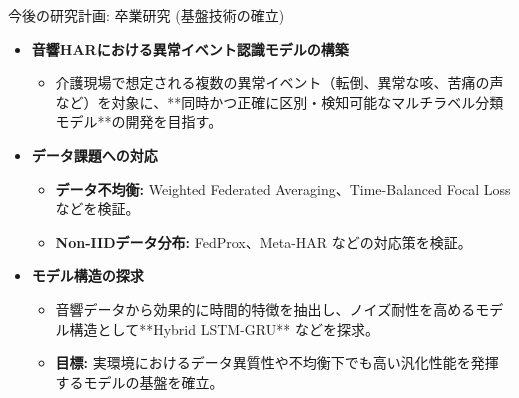 \documentclass[unicode,12pt,aspectratio=169, dvipdfmx]{beamer}
\begin{document}
\begin{frame}{今後の研究計画: 卒業研究 (基盤技術の確立)}
\begin{itemize}
    \item \textbf{音響HARにおける異常イベント認識モデルの構築}
    \begin{itemize}
        \item 介護現場で想定される複数の異常イベント（転倒、異常な咳、苦痛の声など）を対象に、**同時かつ正確に区別・検知可能なマルチラベル分類モデル**の開発を目指す。
    \end{itemize}
    \item \textbf{データ課題への対応}
    \begin{itemize}
        \item \textbf{データ不均衡:} Weighted Federated Averaging、Time-Balanced Focal Loss などを検証。
        \item \textbf{Non-IIDデータ分布:} FedProx、Meta-HAR などの対応策を検証。
    \end{itemize}
    \item \textbf{モデル構造の探求}
    \begin{itemize}
        \item 音響データから効果的に時間的特徴を抽出し、ノイズ耐性を高めるモデル構造として**Hybrid LSTM-GRU** などを探求。
        \item \textbf{目標:} 実環境におけるデータ異質性や不均衡下でも高い汎化性能を発揮するモデルの基盤を確立。
    \end{itemize}
\end{itemize}
\end{frame}
\end{document}
